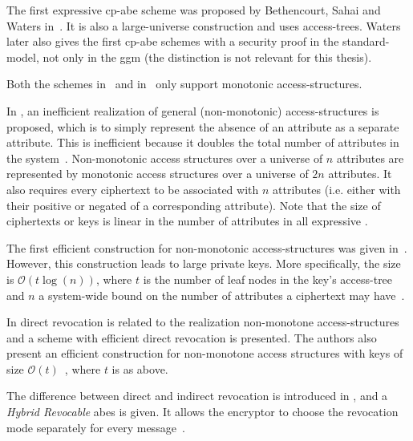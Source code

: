 The first expressive \acrshort{cp-abe} scheme was proposed by Bethencourt, Sahai and Waters in~\cite{bethencourt_ciphertext-policy_2007}.
It is also a large-universe construction and uses \glspl{access-tree}.
Waters \cite{waters_ciphertext-policy_2011} later also gives the first \acrshort{cp-abe} schemes with a security proof in the \gls{standard-model}, not only in the \gls{ggm} (the distinction is not relevant for this thesis).

Both the schemes in~\cite{goyal_attribute-based_2006} and in~\cite{bethencourt_ciphertext-policy_2007} only support monotonic \glspl{access-structure}.

In \cite{goyal_attribute-based_2006}, an inefficient realization of general (non-monotonic) \glspl{access-structure} is proposed, which is to simply represent the absence of an attribute as a separate attribute.
This is inefficient because it doubles the total number of attributes in the system~\cite{goyal_attribute-based_2006}. 
Non-monotonic access structures over a universe of $n$ attributes are represented by monotonic access structures over a universe of $2n$ attributes.
It also requires every ciphertext to be associated with $n$ attributes (i.e. either with their positive or negated of a corresponding attribute).
Note that the size of ciphertexts or keys is linear in the number of attributes in all expressive . %

The first efficient construction for non-monotonic \glspl{access-structure} was given in~\cite{ostrovsky_attribute-based_2007}. 
However, this construction leads to large private keys.
More specifically, the size is $\mathcal{O}(t \log(n))$, where $t$ is the number of leaf nodes in the key's \gls{access-tree} and $n$ a system-wide bound on the number of attributes a ciphertext may have~\cite{lewko_revocation_2008}. %

In \cite{lewko_revocation_2008} direct revocation is related to the realization non-monotone \glspl{access-structure} and a scheme with efficient direct revocation is presented.
The authors also present an efficient construction for non-monotone access structures with keys of size $\mathcal{O}(t)$~\cite{lewko_revocation_2008}, where $t$ is as above.

The difference between direct and indirect revocation is introduced in \cite{attrapadung_attribute-based_2009}, and a \emph{Hybrid Revocable} \acrshort{abes} is given.
It allows the encryptor to choose the revocation mode separately for every message~\cite{attrapadung_attribute-based_2009}.

